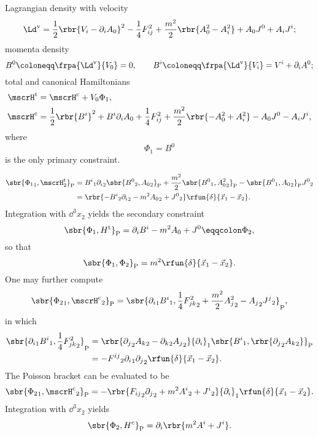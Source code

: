 \documentclass[a4paper,11pt]{article}
\begin{document}
Lagrangian density with velocity
\begin{equation}
\Ld^\text{v} = \frac{1}{2} \rbr{V_i - \partial_i A_0}^2 - \frac{1}{4} F_{ij}^2 
+ \frac{m^2}{2} \rbr{A_0^2 - A_i^2} + A_0 J^0 + A_i J^i;
\end{equation}
momenta density
\begin{equation}
B^0 \coloneqq \frpa{\Ld^\text{v}}{V_0} = 0,\qquad
B^i \coloneqq \frpa{\Ld^\text{v}}{V_i} = V^i + \partial_i A^0;
\end{equation}
total and canonical Hamiltonians
\begin{align}
\mscrH^\text{t} &= \mscrH^\text{c} + V_0 \Phi_1,\\
\mscrH^\text{c} &= \frac{1}{2} \rbr{B^i}^2 + B^i \partial_i A_0 + \frac{1}{4} 
F_{ij}^2 + \frac{m^2}{2} \rbr{-A_0^2 + A_i^2} - A_0 J^0 - A_i J^i,\\
\end{align}
where
\begin{equation}
\Phi_1 = B^0
\end{equation}
is the only primary constraint.


\begin{align}
\sbr{{\Phi_1}_1,{\mscrH^\text{t}_2}}_\text{P} &=
{B^i}_1 {\partial_i}_2 \sbr{{B^0}_2, {A_0}_2}_\text{P} +
\frac{m^2}{2}\sbr{{B^0}_1, {A_0^2}_2}_\text{P} -
\sbr{{B^0}_1, {A_0}_2}_\text{P} {J^0}_2 \nonumber \\
&= \rbr{-{B^i}_2 {\partial_i}_2 - m^2 {A_0}_2 + {J^0}_2}
\rfun{\delta}{\vec{x}_1 - \vec{x}_2}.
\end{align}
Integration with $\dd^3 x_2$ yields the secondary constraint
\begin{equation}
\sbr{\Phi_1, H^\text{t}}_\text{P} = \partial_i B^i - m^2 A_0 + J^0 
\eqqcolon \Phi_2,
\end{equation}
so that
\begin{equation}
\sbr{\Phi_1,\Phi_2}_\text{P} = m^2\rfun{\delta}{\vec{x}_1-\vec{x}_2}.
\label{eq:Maxwell-Proca-Q}
\end{equation}
One may further compute
\begin{equation}
\sbr{{\Phi_2}_1, {\mscrH^\text{c}}_2}_\text{P} = \sbr{{\partial_i}_1 {B^i}_1,
\frac{1}{4} {F_{jk}^2}_2 + \frac{m^2}{2} {A_j^2}_2 - {A_j}_2 {J^j}_2}_\text{P},
\end{equation}
in which
\begin{align}
\sbr{{\partial_i}_1 {B^i}_1, \frac{1}{4} {F_{jk}^2}_2}_\text{P} &=
\rbr{{\partial_j}_2 {A_k}_2 - {\partial_k}_2 {A_j}_2}
{\partial_i}_1 \sbr{{B^i}_1, \rbr{{\partial_j}_2 {A_k}_2}}_\text{P} \nonumber \\
&= -{F^{ij}}_2 {\partial_i}_1{\partial_j}_2\rfun{\delta}{\vec{x}_1-\vec{x}_2}.
\end{align}
The Poisson bracket can be evaluated to be
\begin{equation}
\sbr{{\Phi_2}_1, {\mscrH^\text{c}}_2}_\text{P} =
-\rbr{{F_{ij}}_2 {\partial_j}_2 + m^2 {A^i}_2 + {J^i}_2}
{\partial_i}_1\rfun{\delta}{\vec{x}_1-\vec{x}_2}.
\end{equation}
Integration with $\dd^3 x_2$ yields
\begin{equation}
\sbr{\Phi_2, H^\text{c}}_\text{P} = \partial_i\rbr{m^2 A^i + J^i}.
\end{equation}
\end{document}
